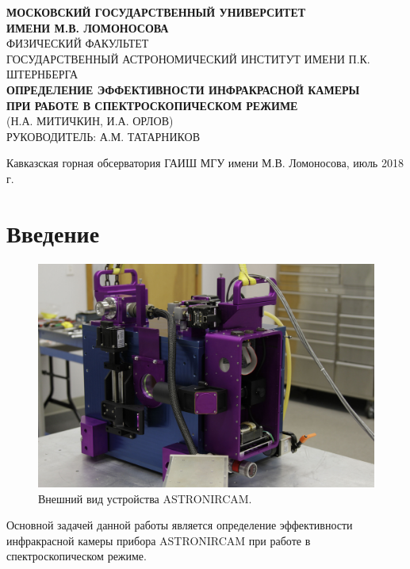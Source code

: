 \documentclass[a4paper]{article}
\begin{document}
\setcounter{page}{0} 
\begin{titlepage}
\begin{center}
\large{\textbf{МОСКОВСКИЙ ГОСУДАРСТВЕННЫЙ УНИВЕРСИТЕТ\\ИМЕНИ М.В. ЛОМОНОСОВА}}\\
\hfill\break
\normalsize{ФИЗИЧЕСКИЙ ФАКУЛЬТЕТ}\\
\hfill\break
\normalsize{ГОСУДАРСТВЕННЫЙ АСТРОНОМИЧЕСКИЙ ИНСТИТУТ ИМЕНИ П.К. ШТЕРНБЕРГА}\\
\hfill\break
\hfill\break
\hfill\break
\hfill\break
\hfill\break
\hfill\break
\hfill\break
\hfill\break
\hfill\break
\hfill\break
\Large{\textbf{ОПРЕДЕЛЕНИЕ ЭФФЕКТИВНОСТИ ИНФРАКРАСНОЙ КАМЕРЫ\\ПРИ РАБОТЕ В СПЕКТРОСКОПИЧЕСКОМ РЕЖИМЕ}}\\
\hfill\break
\normalsize{(Н.А. МИТИЧКИН, И.А. ОРЛОВ)}\\
\hfill\break
\normalsize{РУКОВОДИТЕЛЬ: А.М. ТАТАРНИКОВ}\\
\end{center}
\hfill\break
\hfill\break
\hfill\break
\hfill\break
\hfill\break
\hfill\break
\hfill\break
\hfill\break
\hfill\break
\hfill\break
\hfill\break
\hfill\break
\hfill\break
\hfill\break
\hfill\break
\hfill\break 
\hfill\break
\hfill\break
\hfill\break
\begin{center}
Кавказская горная обсерватория ГАИШ МГУ имени М.В. Ломоносова, июль 2018 г.
\end{center}
\thispagestyle{empty}
\end{titlepage}
\newpage
\tableofcontents
\newpage
\section{Введение}
\begin{figure} 
\vspace{-4ex}
\includegraphics[width=\linewidth]{11}
\caption{Внешний вид устройства ASTRONIRCAM.}
\label{fig:1}
\end{figure}
Основной задачей данной работы является определение эффективности инфракрасной камеры прибора ASTRONIRCAM при работе в спектроскопическом режиме.
\end{document}
